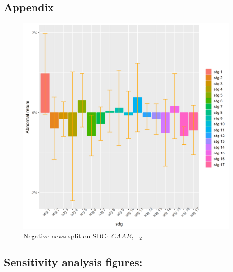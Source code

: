 \subsection{Appendix} \label{app: derivations}
\begin{figure} [H] 
    \centering
    \includegraphics[scale=0.6]{Projekt/1.Figures analysis/ST_negative_sdg_bar_2.png} 
    \caption{Negative news split on SDG: $CAAR_{t=2}$}
    \label{fig:ST_pos_news}
\end{figure}

\subsection{Sensitivity analysis figures:}
